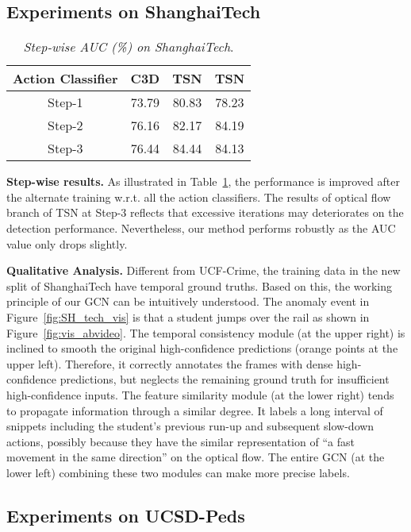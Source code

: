 \documentclass[10pt,twocolumn,letterpaper]{article}
\begin{document}
\subsection{Experiments on ShanghaiTech}

\begin{table}\centering
  \caption{\emph{Step-wise AUC (\%) on ShanghaiTech}.}\label{tab:SH_det}
  \begin{tabular}{cccc}
    \hline
    \textbf{Action Classifier}  &  \textbf{C3D} & \textbf{TSN} & \textbf{TSN}\\
    \hline
    {Step-1}       & 73.79 & 80.83 & 78.23 \\
    {Step-2}       & 76.16 & 82.17 & 84.19 \\
    {Step-3}       & 76.44 & 84.44 & 84.13 \\
    \hline
  \end{tabular}
\end{table}

\textbf{Step-wise results.}
As illustrated in Table~\ref{tab:SH_det}, the performance is improved after the alternate training w.r.t. all the action classifiers. The results of optical flow branch of TSN at Step-3 reflects that excessive iterations may deteriorates on the detection performance. Nevertheless, our method performs robustly as the AUC value only drops slightly.

\textbf{Qualitative Analysis.}
Different from UCF-Crime, the training data in the new split of ShanghaiTech have temporal ground truths. Based on this, the working principle of our GCN can be intuitively understood. The anomaly event in Figure~\ref{fig:SH_tech_vis} is that a student jumps over the rail as shown in Figure~\ref{fig:vis_abvideo}. The temporal consistency module (at the upper right) is inclined to smooth the original high-confidence predictions (orange points at the upper left). Therefore, it correctly annotates the  frames with dense high-confidence predictions, but neglects the remaining ground truth for insufficient high-confidence inputs. The feature similarity module (at the lower right) tends to propagate information through a similar degree. It labels a long interval of snippets including the student's previous run-up and subsequent slow-down actions, possibly because they have the similar representation of ``a fast movement in the same direction'' on the optical flow. The entire GCN (at the lower left) combining these two modules can make more precise labels.


\subsection{Experiments on UCSD-Peds}
\end{document}

